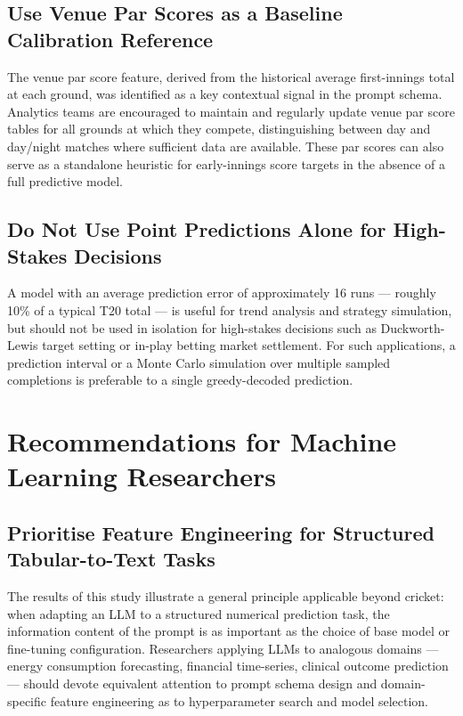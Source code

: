 \subsection{Use Venue Par Scores as a Baseline Calibration Reference}

The venue par score feature, derived from the historical average first-innings total at each ground, was identified as a key contextual signal in the prompt schema. Analytics teams are encouraged to maintain and regularly update venue par score tables for all grounds at which they compete, distinguishing between day and day/night matches where sufficient data are available. These par scores can also serve as a standalone heuristic for early-innings score targets in the absence of a full predictive model.

\subsection{Do Not Use Point Predictions Alone for High-Stakes Decisions}

A model with an average prediction error of approximately 16 runs --- roughly 10\% of a typical T20 total --- is useful for trend analysis and strategy simulation, but should not be used in isolation for high-stakes decisions such as Duckworth-Lewis target setting or in-play betting market settlement. For such applications, a prediction interval or a Monte Carlo simulation over multiple sampled completions is preferable to a single greedy-decoded prediction.

\section{Recommendations for Machine Learning Researchers}

\subsection{Prioritise Feature Engineering for Structured Tabular-to-Text Tasks}

The results of this study illustrate a general principle applicable beyond cricket: when adapting an LLM to a structured numerical prediction task, the information content of the prompt is as important as the choice of base model or fine-tuning configuration. Researchers applying LLMs to analogous domains --- energy consumption forecasting, financial time-series, clinical outcome prediction --- should devote equivalent attention to prompt schema design and domain-specific feature engineering as to hyperparameter search and model selection.

